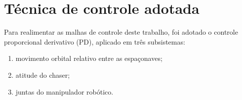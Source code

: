 \section{Técnica de controle adotada}
\label{sec:tecnica_pd}

Para realimentar as malhas de controle deste trabalho, foi adotado o controle proporcional derivativo (PD), aplicado em três subsistemas:
\begin{enumerate}[label=\roman*.]
    \item movimento orbital relativo entre as espaçonaves;
    \item atitude do chaser;
    \item juntas do manipulador robótico.
\end{enumerate}












